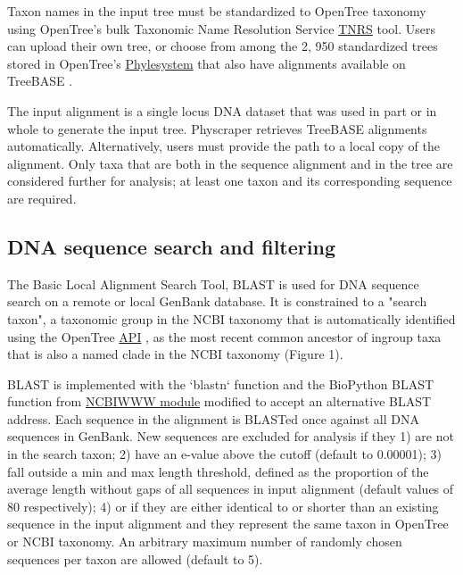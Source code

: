 \documentclass{bmcart}
\begin{document}
Taxon names in the input tree must be standardized to OpenTree taxonomy
\cite{rees2017automated} using OpenTree's bulk Taxonomic Name Resolution Service
\href{https://tree.opentreeoflife.org/curator/tnrs/}{TNRS} tool. Users can upload their
own tree, or choose from among the 2, 950 standardized trees stored in OpenTree's
\href{https://github.com/opentreeoflife/phylesystem}{Phylesystem} that also have
alignments available on TreeBASE \cite{piel2009treebase}.

The input alignment is a single locus DNA dataset that was used in part or in
whole to generate the input tree. Physcraper retrieves TreeBASE alignments
automatically. Alternatively, users must provide the path to a local copy of the
alignment.
Only taxa that are both in the sequence alignment and in the tree are considered
further for analysis; at least one taxon and its corresponding sequence are required.

\subsection*{DNA sequence search and filtering}

The Basic Local Alignment Search Tool, BLAST \cite{altschul1990basic} is used for DNA
sequence search on a remote or local GenBank database. It is constrained to a
"search taxon", a taxonomic group in the NCBI taxonomy that is automatically
identified using the OpenTree
\href{<https://github.com/OpenTreeOfLife/germinator/wiki/Taxonomy-API-v3#mrca>}{API}
\cite{rees2017automated}, as the most recent common ancestor of ingroup taxa that is
also a named clade in the NCBI taxonomy (Figure 1).

BLAST is implemented with the `blastn` function \cite{camacho2009blast} and the BioPython
\cite{cock2009biopython} BLAST function from
\href{https://biopython.org/DIST/docs/api/Bio.Blast.NCBIWWW-module.html}{NCBIWWW module}
modified to accept an alternative BLAST address.
Each sequence in the alignment is BLASTed once against all DNA sequences in GenBank.
New sequences are excluded for analysis if they 1) are not in the search taxon;
2) have an e-value above the cutoff (default to 0.00001); 3) fall outside a min
and max length threshold, defined as the proportion of the average length without
gaps of all sequences in input alignment (default values of 80%
respectively); 4) or if they are either identical to or shorter than an existing
sequence in the input alignment and they represent the same taxon in OpenTree or
NCBI taxonomy.
An arbitrary maximum number of randomly chosen sequences per taxon are allowed
(default to 5).
\end{document}
